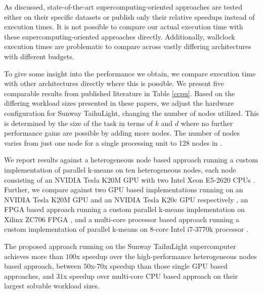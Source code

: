 As discussed, state-of-the-art supercomputing-oriented approaches are tested either on their specific datasets \cite{kumar2011parallel,cai2015grouping} or publish only their relative speedups \cite{bender2015k} instead of execution times. It is not possible to compare our actual execution time with these supercomputing-oriented approaches directly. Additionally, wallclock execution times are problematic to compare across vastly differing architectures with different budgets.

To give some insight into the performance we obtain, we compare execution time with other architectures directly where this is possible. We present five comparable results from published literature in Table \ref{ccpu}. Based on the differing workload sizes presented in these papers, we adjust the hardware configuration for Sunway TaihuLight, changing the number of nodes utilized. This is determined by the size of the task in terms of $k$ and $d$ where no further performance gains are possible by adding more nodes. The number of nodes varies from just one node for a single processing unit \cite{jin2018high,li2016high} to 128 nodes in \cite{rossbach2013dandelion}.

We report results against a heterogeneous node based approach running a custom implementation of parallel k-means on ten heterogeneous nodes, each node consisting of an NVIDIA Tesla K20M GPU with two Intel Xeon E5-2620 CPUs \cite{rossbach2013dandelion}. Further, we compare against two GPU based implementations  running on an NVIDIA Tesla K20M GPU and an NVIDIA Tesla K20c GPU respectively \cite{bhimani2015accelerating, jin2018high}, an FPGA based approach running a custom parallel k-means implementation on Xilinx ZC706 FPGA \cite{li2016high}, and a multi-core processor based approach running a custom implementation of parallel k-means on 8-core Intel i7-3770k processor \cite{ding2015yinyang}.

The proposed approach running on the Sunway TaihuLight supercomputer achieves
more than $100$x speedup over the high-performance heterogeneous nodes based approach, between $50$x-$70$x speedup than those single GPU based approaches, and $31$x speedup over multi-core CPU based approach on their largest solvable workload sizes. 


